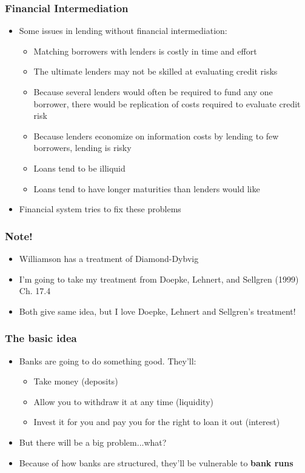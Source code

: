 \documentclass{beamer}
\begin{document}
\begin{frame}
\frametitle[alignment=center]{Financial Intermediation}
\begin{itemize}
\item Some issues in lending without financial intermediation:
\bigskip
\begin{itemize}
\item Matching borrowers with lenders is costly in time and effort
\bigskip
\item The ultimate lenders may not be skilled at evaluating credit risks
\bigskip
\item Because several lenders would often be required to fund any one borrower, there would be replication of costs required to evaluate credit risk
\bigskip
\item Because lenders economize on information costs by lending to few borrowers,  lending is risky
\bigskip
\item Loans tend to be illiquid
\bigskip
\item Loans tend to have longer maturities than lenders would like
\end{itemize}
\bigskip
\item Financial system tries to fix these problems
\end{itemize}
\end{frame}




\begin{frame}
\frametitle[alignment=center]{Note!}
\begin{itemize}
\item Williamson has a treatment of Diamond-Dybvig
\bigskip
\item I'm going to take my treatment from Doepke, Lehnert, and Sellgren (1999) Ch. 17.4
\bigskip
\item Both give same idea, but I love Doepke, Lehnert and Sellgren's treatment!
\end{itemize}
\end{frame}


\begin{frame}
\frametitle{The basic idea}
\begin{itemize}
\item<1-> Banks are going to do something good.  They'll:
\bigskip
\begin{itemize}
\item<2-> Take money (deposits)
\bigskip
\item<2-> Allow you to withdraw it at any time (liquidity)
\bigskip
\item<2-> Invest it for you and pay you for the right to loan it out (interest)
\bigskip
\end{itemize}
\item<3-> But there will be a big problem...what?
\bigskip
\item<4-> Because of how banks are structured, they'll be vulnerable to \textbf{bank runs}
\end{itemize}
\end{frame}
\end{document}
